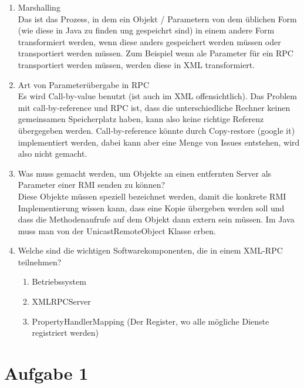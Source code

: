 \begin{enumerate}
\begin{enumerate}
\begin{enumerate}
\end{enumerate}

\end{enumerate}

\item Marshalling \\
Das ist das Prozess, in dem ein Objekt / Parametern von dem üblichen Form (wie diese in Java zu finden ung gespeichrt sind) in einem andere Form transformiert werden, wenn diese anders gespeichert werden müssen oder transportiert werden müssen. Zum Beispiel wenn ale Parameter für ein RPC transportiert werden müssen, werden diese in XML transformiert.

\item Art von Parameterübergabe in RPC \\
Es wird Call-by-value benutzt (ist auch im XML offensichtlich). Das Problem mit call-by-reference und RPC ist, dass die unterschiedliche Rechner keinen gemeinsamen Speicherplatz haben, kann also keine richtige Referenz übergegeben werden. Call-by-reference könnte durch Copy-restore (google it) implementiert werden, dabei kann aber eine Menge von Issues entstehen, wird also nicht gemacht.

\item Was muss gemacht werden, um Objekte an einen entfernten Server als Parameter einer RMI
senden zu können? \\

Diese Objekte müssen speziell bezeichnet werden, damit die konkrete RMI Implementierung wissen kann, dass eine Kopie übergeben werden soll und dass die Methodenaufrufe auf dem Objekt dann extern sein müssen. Im Java muss man von der UnicastRemoteObject Klasse erben.

\item Welche sind die wichtigen Softwarekomponenten, die in einem XML-RPC teilnehmen? \\

\begin{enumerate}

\item Betriebssystem
\item XMLRPCServer
\item PropertyHandlerMapping (Der Register, wo alle mögliche Dienste registriert werden)

\end{enumerate}

\end{enumerate}


\section*{Aufgabe 1}

